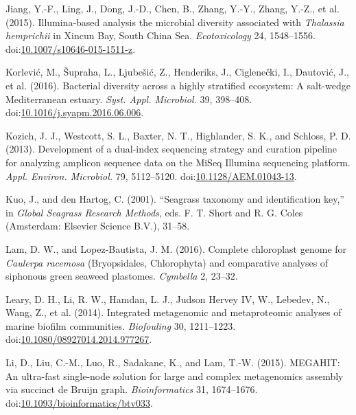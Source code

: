 \documentclass[12pt,]{article}
\begin{document}
\leavevmode\hypertarget{ref-Jiang2015}{}%
Jiang, Y.-F., Ling, J., Dong, J.-D., Chen, B., Zhang, Y.-Y., Zhang,
Y.-Z., et al. (2015). Illumina-based analysis the microbial diversity
associated with \emph{Thalassia hemprichii} in Xincun Bay, South China
Sea. \emph{Ecotoxicology} 24, 1548--1556.
doi:\href{https://doi.org/10.1007/s10646-015-1511-z}{10.1007/s10646-015-1511-z}.

\leavevmode\hypertarget{ref-Korlevic2016}{}%
Korlević, M., Šupraha, L., Ljubešić, Z., Henderiks, J., Ciglenečki, I.,
Dautović, J., et al. (2016). Bacterial diversity across a highly
stratified ecosystem: A salt-wedge Mediterranean estuary. \emph{Syst.
Appl. Microbiol.} 39, 398--408.
doi:\href{https://doi.org/10.1016/j.syapm.2016.06.006}{10.1016/j.syapm.2016.06.006}.

\leavevmode\hypertarget{ref-Kozich2013}{}%
Kozich, J. J., Westcott, S. L., Baxter, N. T., Highlander, S. K., and
Schloss, P. D. (2013). Development of a dual-index sequencing strategy
and curation pipeline for analyzing amplicon sequence data on the MiSeq
Illumina sequencing platform. \emph{Appl. Environ. Microbiol.} 79,
5112--5120.
doi:\href{https://doi.org/10.1128/AEM.01043-13}{10.1128/AEM.01043-13}.

\leavevmode\hypertarget{ref-Kuo2001}{}%
Kuo, J., and den Hartog, C. (2001). ``Seagrass taxonomy and
identification key,'' in \emph{Global Seagrass Research Methods}, eds.
F. T. Short and R. G. Coles (Amsterdam: Elsevier Science B.V.), 31--58.

\leavevmode\hypertarget{ref-Lam2016}{}%
Lam, D. W., and Lopez-Bautista, J. M. (2016). Complete chloroplast
genome for \emph{Caulerpa racemosa} (Bryopsidales, Chlorophyta) and
comparative analyses of siphonous green seaweed plastomes.
\emph{Cymbella} 2, 23--32.

\leavevmode\hypertarget{ref-Leary2014}{}%
Leary, D. H., Li, R. W., Hamdan, L. J., Judson Hervey IV, W., Lebedev,
N., Wang, Z., et al. (2014). Integrated metagenomic and metaproteomic
analyses of marine biofilm communities. \emph{Biofouling} 30,
1211--1223.
doi:\href{https://doi.org/10.1080/08927014.2014.977267}{10.1080/08927014.2014.977267}.

\leavevmode\hypertarget{ref-Li2015}{}%
Li, D., Liu, C.-M., Luo, R., Sadakane, K., and Lam, T.-W. (2015).
MEGAHIT: An ultra-fast single-node solution for large and complex
metagenomics assembly via succinct de Bruijn graph.
\emph{Bioinformatics} 31, 1674--1676.
doi:\href{https://doi.org/10.1093/bioinformatics/btv033}{10.1093/bioinformatics/btv033}.
\end{document}
